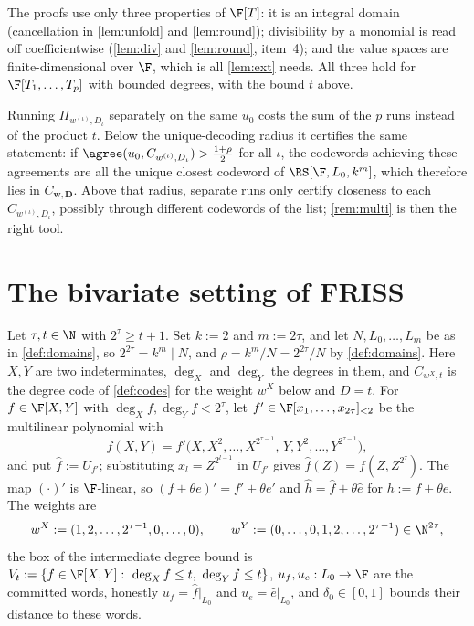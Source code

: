 {{\begin{remark}
The proofs use only three properties of $\F[T]$: it is an integral domain (cancellation in
\ref{lem:unfold} and \ref{lem:round}); divisibility by a monomial is read off coefficientwise
(\ref{lem:div} and \ref{lem:round}, item~4); and the value spaces are finite-dimensional over
$\F$, which is all \ref{lem:ext} needs. All three hold for $\F[T_1,\dots,T_p]$ with bounded
degrees, with the bound $t$ above.
\end{remark}

\begin{remark}\label{rem:separate}
Running $\Pi_{w^{(\iota)},D_{\iota}}$ separately on the same $u_0$ costs the sum of the $p$ runs instead
of the product $t$. Below the unique-decoding radius it certifies the same statement: if
$\agree(u_0,C_{w^{(\iota)},D_{\iota}})>\frac{1+\rho}2$ for all $\iota$, the codewords achieving these
agreements are all the unique closest codeword of $\RS[\F,L_0,k^m]$, which therefore lies in
$C_{\mathbf w,\mathbf D}$. Above that radius, separate runs only certify closeness to each
$C_{w^{(\iota)},D_{\iota}}$, possibly through different codewords of the list; \ref{rem:multi} is then
the right tool.
\end{remark}

\section{The bivariate setting of {FRISS}}

\begin{definition}\label{def:avss}\leanok{}
Let $\tau,t\in\N$ with $2^\tau\ge t+1$. Set $k:=2$ and $m:=2\tau$, and let $N,L_0,\dots,L_m$ be
as in \ref{def:domains}, so $2^{2\tau}=k^m\mid N$, and $\rho=k^m/N=2^{2\tau}/N$ by
\ref{def:domains}. Here $X,Y$ are two
indeterminates, $\deg_X$ and $\deg_Y$ the degrees in them, and $C_{w^X,t}$ is the degree code of
\ref{def:codes} for the weight $w^X$ below and $D=t$. For
$f\in\F[X,Y]$ with $\deg_Xf,\deg_Yf<2^\tau$, let $f'\in\F[x_1,\dots,x_{2\tau}]_{<2}$ be the
multilinear polynomial with
\[
f(X,Y)=f'\big(X,X^2,\dots,X^{2^{\tau-1}},\,Y,Y^2,\dots,Y^{2^{\tau-1}}\big),
\]
and put $\hat f:=U_{f'}$; substituting $x_l=Z^{2^{l-1}}$ in $U_{f'}$ gives
$\hat f(Z)=f(Z,Z^{2^\tau})$. The map $(\cdot)'$ is $\F$-linear, so $(f+\theta e)'=f'+\theta e'$ and
$\hat h=\hat f+\theta\hat e$ for $h:=f+\theta e$. The weights are
\[
w^X:=(1,2,\dots,2^{\tau-1},0,\dots,0),\qquad
w^Y:=(0,\dots,0,1,2,\dots,2^{\tau-1})\in\N^{2\tau},
\]
the box of the intermediate degree bound is $V_t:=\{f\in\F[X,Y]:\ \deg_Xf\le t,\ \deg_Yf\le t\}$,
$u_f,u_e:L_0\to\F$ are the committed words, honestly $u_f=\hat f|_{L_0}$ and
$u_e=\hat e|_{L_0}$, and $\delta_0\in[0,1]$ bounds their distance to these words.
\end{definition}

}}
